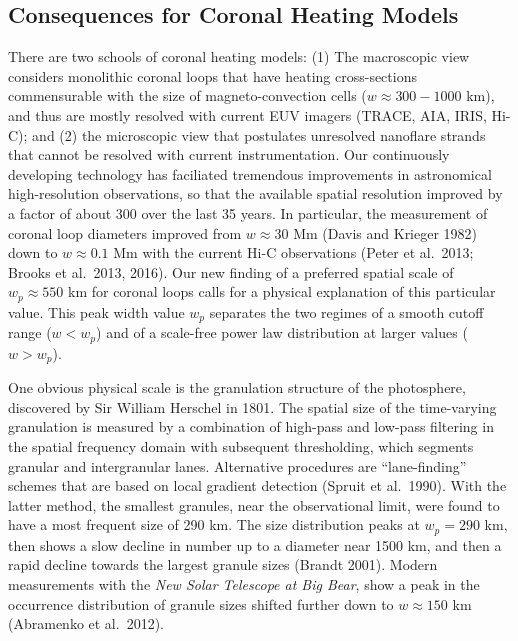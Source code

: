\documentclass[10pt,preprint]{aastex}  %
\begin{document}
\subsection{	Consequences for Coronal Heating Models 	}

There are two schools of coronal heating models: 
(1) The macroscopic view considers monolithic coronal loops that 
have heating cross-sections commensurable with the size of 
magneto-convection  cells ($w \approx 300-1000$ km), and thus 
are mostly resolved with current EUV imagers (TRACE, AIA, 
IRIS, Hi-C); and (2) the microscopic view that postulates unresolved 
nanoflare strands that cannot be resolved with current instrumentation. 
Our continuously developing technology has faciliated
tremendous improvements in astronomical high-resolution observations,
so that the available spatial resolution improved by a factor of about 300
over the last 35 years. In particular, the measurement of
coronal loop diameters improved from $w \approx 30$ Mm (Davis and
Krieger 1982) down to $w \approx 0.1$ Mm with the current Hi-C observations
(Peter et al.~2013; Brooks et al.~2013, 2016). Our new finding
of a preferred spatial scale of $w_p \approx 550$ km for coronal loops 
calls for a physical explanation of this particular value. 
This peak width value $w_p$ separates the two regimes of a
smooth cutoff range ($w < w_p$) and of a scale-free power law
distribution at larger values ($w > w_p$). 

One obvious physical scale is the granulation structure of the
photosphere, discovered by Sir William Herschel in 1801.
The spatial size of the time-varying granulation is measured
by a combination of high-pass and low-pass filtering in the
spatial frequency domain with subsequent thresholding, which
segments granular and intergranular lanes. Alternative
procedures are ``lane-finding'' schemes that are based on local
gradient detection (Spruit et al.~1990). With the latter method,
the smallest granules, near the observational limit, were found
to have a most frequent size of 290 km. The size distribution 
peaks at $w_p=290$ km, then shows a slow decline
in number up to a diameter near 1500 km, and then a rapid
decline towards the largest granule sizes (Brandt 2001). 
Modern measurements with the {\sl New Solar Telescope at Big Bear},
show a peak in the occurrence distribution of granule sizes 
shifted further down to $w \approx 150$ km (Abramenko et al.~2012).
\end{document}
